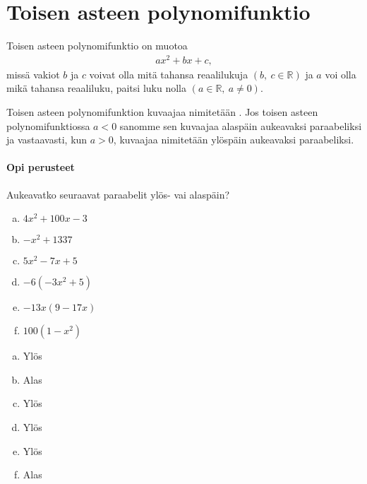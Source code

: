 \section{Toisen asteen polynomifunktio}


Toisen asteen polynomifunktio on muotoa
\begin{align*}
ax^2+bx+c,
\end{align*}
missä vakiot $b$ ja $c$ voivat olla mitä tahansa reaalilukuja $(b, \ c \in \mathbb{R})$ ja $a$ voi olla mikä tahansa reaaliluku, paitsi luku nolla $(a \in \mathbb{R}, \ a \neq 0)$.

Toisen asteen polynomifunktion kuvaajaa nimitetään . Jos toisen asteen polynomifunktiossa $a < 0$ sanomme sen kuvaajaa
alaspäin aukeavaksi paraabeliksi ja vastaavasti, kun $a > 0$, kuvaajaa nimitetään ylöspäin aukeavaksi paraabeliksi.


\begin{tehtavasivu}

\paragraph*{Opi perusteet}

\begin{tehtava}
  Aukeavatko seuraavat paraabelit ylös- vai alaspäin?
  \begin{enumerate}[a)]
    \item $4x^2 + 100x - 3$
    \item $-x^2 + 1337$
    \item $5x^2 - 7x + 5$
    \item $-6(-3x^2 + 5)$
    \item $-13x(9 - 17x)$
    \item $100(1-x^2)$
  \end{enumerate}

  \begin{vastaus}
    \begin{enumerate}[a)]
      \item Ylös
      \item Alas
      \item Ylös
      \item Ylös
      \item Ylös
      \item Alas
    \end{enumerate}
  \end{vastaus}
\end{tehtava}

\end{tehtavasivu}